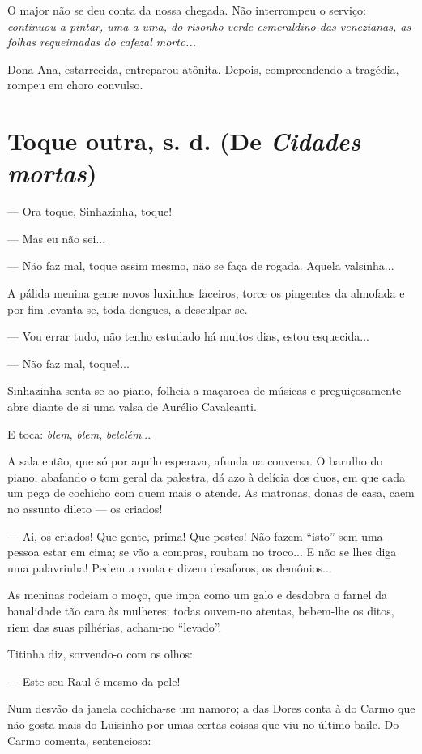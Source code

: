 O major não se deu conta da nossa chegada. Não interrompeu o serviço:
\emph{continuou a pintar, uma a uma, do risonho verde esmeraldino das
venezianas, as folhas requeimadas do cafezal morto...}

Dona Ana, estarrecida, entreparou atônita. Depois, compreendendo a
tragédia, rompeu em choro convulso.

\chapter{Toque outra, s. d. (De \emph{Cidades mortas})}

--- Ora toque, Sinhazinha, toque!

--- Mas eu não sei...

--- Não faz mal, toque assim mesmo, não se faça de rogada. Aquela
valsinha...

A pálida menina geme novos luxinhos faceiros, torce os pingentes da
almofada e por fim levanta-se, toda dengues, a desculpar-se.

--- Vou errar tudo, não tenho estudado há muitos dias, estou
esquecida...

--- Não faz mal, toque!...

Sinhazinha senta-se ao piano, folheia a maçaroca de músicas e
preguiçosamente abre diante de si uma valsa de Aurélio Cavalcanti.

E toca: \emph{blem}, \emph{blem}, \emph{belelém}...

A sala então, que só por aquilo esperava, afunda na conversa. O barulho
do piano, abafando o tom geral da palestra, dá azo à delícia dos duos,
em que cada um pega de cochicho com quem mais o atende. As matronas,
donas de casa, caem no assunto dileto --- os criados!

--- Ai, os criados! Que gente, prima! Que pestes! Não fazem ``isto'' sem
uma pessoa estar em cima; se vão a compras, roubam no troco... E não se
lhes diga uma palavrinha! Pedem a conta e dizem desaforos, os
demônios...

As meninas rodeiam o moço, que impa como um galo e desdobra o farnel da
banalidade tão cara às mulheres; todas ouvem-no atentas, bebem-lhe os
ditos, riem das suas pilhérias, acham-no ``levado''.

Titinha diz, sorvendo-o com os olhos:

--- Este seu Raul é mesmo da pele!

Num desvão da janela cochicha-se um namoro; a das Dores conta à do Carmo
que não gosta mais do Luisinho por umas certas coisas que viu no último
baile. Do Carmo comenta, sentenciosa:

